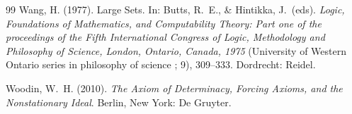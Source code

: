\documentclass[12pt]{article}
\theoremstyle{plain}
\theoremstyle{definition}
\begin{document}
\begin{thebibliography}{99}
	 Wang, H. (1977). Large Sets. In: Butts, R.\ E., \& Hintikka, J.\ (eds). \textit{Logic, Foundations of Mathematics, and Computability Theory: Part one of the proceedings of the Fifth International Congress of Logic, Methodology and Philosophy of Science, London, Ontario, Canada, 1975} (University of Western Ontario series in philosophy of science ; 9), 309--333. Dordrecht: Reidel.

	 Woodin, W.\ H. (2010). \textit{The Axiom of Determinacy, Forcing Axioms, and the Nonstationary Ideal}. Berlin, New York: De Gruyter.

\end{thebibliography}
\end{document}
